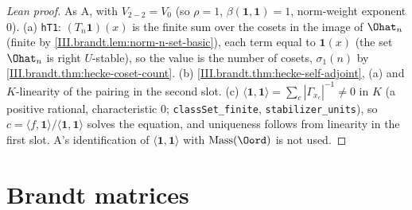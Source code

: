 \begin{proof}[Lean proof]
As A, with $V_{2-2}=V_0$ (so $\rho=1$, $\beta(\mathbf 1,\mathbf 1)=1$, norm-weight exponent $0$). (a) \texttt{hT1}: $(T_n\mathbf 1)(x)$ is the finite sum over the cosets in the image of $\Ohat_n$ (finite by \cref{III.brandt.lem:norm-n-set-basic}), each term equal to $\mathbf 1(x)$ (the set $\Ohat_n$ is right $U$-stable), so the value is the number of cosets, $\sigma_1(n)$ by \cref{III.brandt.thm:hecke-coset-count}. (b) \cref{III.brandt.thm:hecke-self-adjoint}, (a) and $K$-linearity of the pairing in the second slot. (c) $\langle\mathbf 1,\mathbf 1\rangle=\sum_c|\Gamma_{x_c}|^{-1}\neq0$ in $K$ (a positive rational, characteristic $0$; \texttt{classSet\_finite}, \texttt{stabilizer\_units}), so $c=\langle f,\mathbf 1\rangle/\langle\mathbf 1,\mathbf 1\rangle$ solves the equation, and uniqueness follows from linearity in the first slot. A's identification of $\langle\mathbf1,\mathbf1\rangle$ with $\mathrm{Mass}(\Oord)$ is not used.
\end{proof}

\section{Brandt matrices}\label{sec:brandt-brandt}

